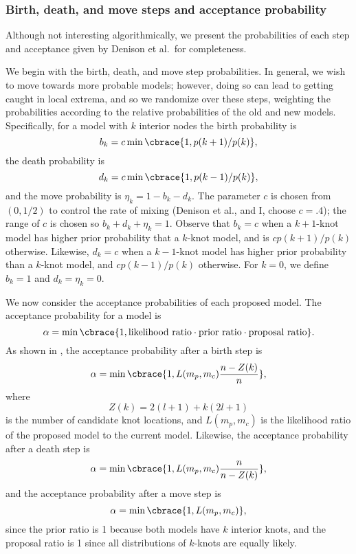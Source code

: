 \documentclass[12pt]{article}
\begin{document}
\subsubsection{Birth, death, and move steps and acceptance
  probability}

Although not interesting algorithmically, we present the probabilities
of each step and acceptance given by Denison et al.\ for completeness.

We begin with the birth, death, and move step probabilities. In
general, we wish to move towards more probable models; however, doing
so can lead to getting caught in local extrema, and so we randomize
over these steps, weighting the probabilities according to the
relative probabilities of the old and new models. Specifically, for a
model with $k$ interior nodes the birth probability is
\begin{equation*}
  b_k = c \min\cbrace{1, p(k + 1) / p(k)},
\end{equation*}
the death probability is
\begin{equation*}
  d_k = c \min\cbrace{1, p(k - 1) / p(k)},
\end{equation*}
and the move probability is $\eta_k = 1 - b_k - d_k$. The parameter
$c$ is chosen from $(0, 1/2)$ to control the rate of mixing (Denison
et al., and I, choose $c = .4$); the range of $c$ is chosen so $b_k +
d_k + \eta_k = 1$. Observe that $b_k = c$ when a $k + 1$-knot model
has higher prior probability that a $k$-knot model, and is $c p(k + 1)
/ p(k)$ otherwise. Likewise, $d_k = c$ when a $k - 1$-knot model has
higher prior probability than a $k$-knot model, and $c p(k - 1) /
p(k)$ otherwise. For $k = 0$, we define $b_k = 1$ and $d_k = \eta_k =
0$.

We now consider the acceptance probabilities of each proposed
model. The acceptance probability for a model is
\begin{equation*}
  \alpha = \min\cbrace{1, \text{likelihood ratio} \cdot \text{prior
      ratio} \cdot \text{proposal ratio}}.
\end{equation*}
As shown in \cite{denison1998automatic}, the acceptance probability
after a birth step is
\begin{equation*}
  \alpha = \min\cbrace{1, L(m_p, m_c) \frac{n - Z(k)}{n}},
\end{equation*}
where
\begin{equation*}
  Z(k) = 2 (l + 1) + k (2 l + 1)
\end{equation*}
is the number of candidate knot locations, and $L(m_p, m_c)$ is the
likelihood ratio of the proposed model to the current model.
Likewise, the acceptance probability after a death step is
\begin{equation*}
  \alpha = \min\cbrace{1, L(m_p, m_c) \frac{n}{n - Z(k)}},
\end{equation*}
and the acceptance probability after a move step is
\begin{equation*}
  \alpha = \min\cbrace{1, L(m_p, m_c)},
\end{equation*}
since the prior ratio is 1 because both models have $k$ interior
knots, and the proposal ratio is 1 since all distributions of
$k$-knots are equally likely.
\end{document}
